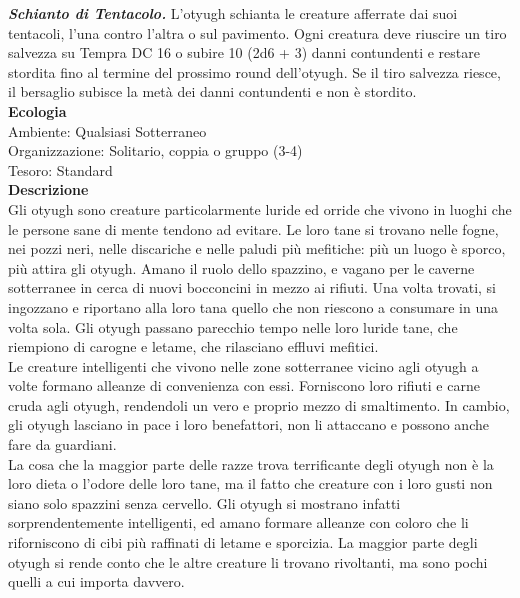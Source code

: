 \begin{multicols}{2}
\emph{\textbf{Schianto di Tentacolo.}} L'otyugh schianta le creature afferrate dai suoi tentacoli, l'una contro l'altra o sul pavimento. Ogni creatura deve riuscire un tiro salvezza su Tempra DC  16 o subire 10 (2d6 + 3) danni contundenti e restare stordita fino al termine del prossimo round dell'otyugh. Se il tiro salvezza riesce, il bersaglio subisce la metà dei danni contundenti e non è stordito.\\
\textbf{Ecologia}\\
Ambiente: Qualsiasi Sotterraneo\\
Organizzazione: Solitario, coppia o gruppo (3-4)\\
Tesoro: Standard\\
\textbf{Descrizione}\\
Gli otyugh sono creature particolarmente luride ed orride che vivono in luoghi che le persone sane di mente tendono ad evitare. Le loro tane si trovano nelle fogne, nei pozzi neri, nelle discariche e nelle paludi più mefitiche: più un luogo è sporco, più attira gli otyugh. Amano il ruolo dello spazzino, e vagano per le caverne sotterranee in cerca di nuovi bocconcini in mezzo ai rifiuti. Una volta trovati, si ingozzano e riportano alla loro tana quello che non riescono a consumare in una volta sola. Gli otyugh passano parecchio tempo nelle loro luride tane, che riempiono di carogne e letame, che rilasciano effluvi mefitici.\\
Le creature intelligenti che vivono nelle zone sotterranee vicino agli otyugh a volte formano alleanze di convenienza con essi. Forniscono loro rifiuti e carne cruda agli otyugh, rendendoli un vero e proprio mezzo di smaltimento. In cambio, gli otyugh lasciano in pace i loro benefattori, non li attaccano e possono anche fare da guardiani.\\
La cosa che la maggior parte delle razze trova terrificante degli otyugh non è la loro dieta o l'odore delle loro tane, ma il fatto che creature con i loro gusti non siano solo spazzini senza cervello. Gli otyugh si mostrano infatti sorprendentemente intelligenti, ed amano formare alleanze con coloro che li riforniscono di cibi più raffinati di letame e sporcizia. La maggior parte degli otyugh si rende conto che le altre creature li trovano rivoltanti, ma sono pochi quelli a cui importa davvero.\\


\end{multicols}
